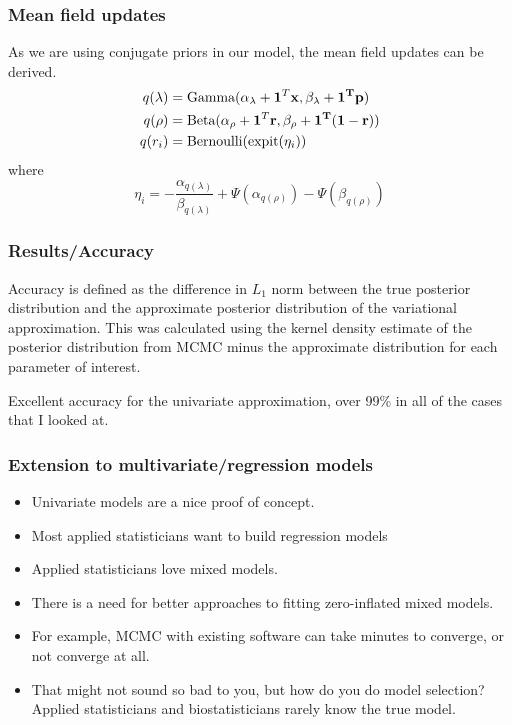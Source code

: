 \documentclass{beamer}
\begin{document}
\begin{frame}
\frametitle{Mean field updates}
As we are using conjugate priors in our model, the mean field updates can be derived.
\begin{align*}
q(\lambda) &= \text{Gamma}(\alpha_\lambda + {\bf 1}^T \bf x, \beta_\lambda + {\bf 1}^T\bf p) \\
q(\rho) &= \text{Beta}(\alpha_\rho + {\bf 1}^T\bf r, \beta_\rho + {\bf 1}^T({\bf 1} - \bf r)) \\
q(r_i) &= \text{Bernoulli}(\text{expit}(\eta_i))
\end{align*}
where
$$
\eta_i = - \frac{\alpha_{q(\lambda)}}{\beta_{q(\lambda)}} + \Psi(\alpha_{q(\rho)}) - \Psi(\beta_{q(\rho)})
$$
\end{frame}

\begin{frame}
\frametitle{Results/Accuracy}
Accuracy is defined as the difference in $L_1$ norm between the true posterior distribution and
the approximate posterior distribution of the variational approximation. This was calculated
using the kernel density estimate of the posterior distribution from MCMC minus the approximate
distribution for each parameter of interest.

Excellent accuracy for the univariate approximation, over 99\% in all of the cases that I looked at.
\end{frame}

\begin{frame}
\frametitle{Extension to multivariate/regression models}
\begin{itemize}
\item Univariate models are a nice proof of concept.
\item Most applied statisticians want to build regression models
\item Applied statisticians love mixed models.
\item There is a need for better approaches to fitting zero-inflated mixed models.
\item For example, MCMC with existing software can take minutes to
converge, or not converge at all.
\item That might not sound so bad to you, but how do you
do model selection? Applied statisticians and biostatisticians rarely know the true model.
\end{itemize}
\end{frame}
\end{document}
